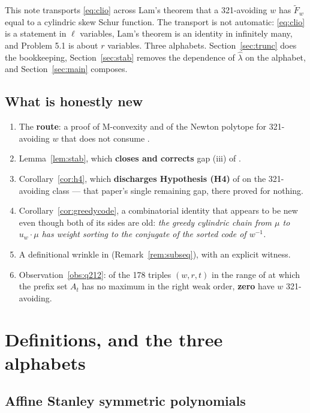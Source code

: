 \documentclass[11pt]{article}
\theoremstyle{plain}
\theoremstyle{definition}
\newcommand{\Fw}{\widetilde{F}_{w}}
\begin{document}
This note transports \eqref{eq:clio} across Lam's theorem that a 321-avoiding $w$ has
$\Fw$ equal to a cylindric skew Schur function. The transport is not automatic: \eqref{eq:clio}
is a statement in $\ell$ variables, Lam's theorem is an identity in infinitely many, and
Problem 5.1 is about $r$ variables. Three alphabets. Section~\ref{sec:trunc} does the
bookkeeping, Section~\ref{sec:stab} removes the dependence of $\hat\lambda$ on the alphabet,
and Section~\ref{sec:main} composes.

\subsection{What is honestly new}

\begin{enumerate}
\item The \textbf{route}: a proof of M-convexity and of the Newton polytope for 321-avoiding
$w$ that does not consume \cite[Cor.~8.5]{Lam2008}.
\item Lemma~\ref{lem:stab}, which \textbf{closes and corrects} gap (iii) of \cite{Clio2026}.
\item Corollary~\ref{cor:h4}, which \textbf{discharges Hypothesis (H4)} of
\cite{Clio2026b} on the 321-avoiding class --- that paper's single remaining gap, there
proved for nothing.
\item Corollary~\ref{cor:greedycode}, a combinatorial identity that appears to be new even
though both of its sides are old: \emph{the greedy cylindric chain from $\mu$ to $u_w\cdot\mu$
has weight sorting to the conjugate of the sorted code of $w^{-1}$.}
\item A definitional wrinkle in \cite{Lam2006} (Remark~\ref{rem:subseq}), with an explicit
witness.
\item Observation~\ref{obs:q212}: of the 178 triples $(w,r,t)$ in the range of
\cite[\S9]{Clio2026b} at which the prefix set $A_t$ has no maximum in the right weak order,
\textbf{zero} have $w$ 321-avoiding.
\end{enumerate}

\section{Definitions, and the three alphabets}\label{sec:defs}

\subsection{Affine Stanley symmetric polynomials}
\end{document}
